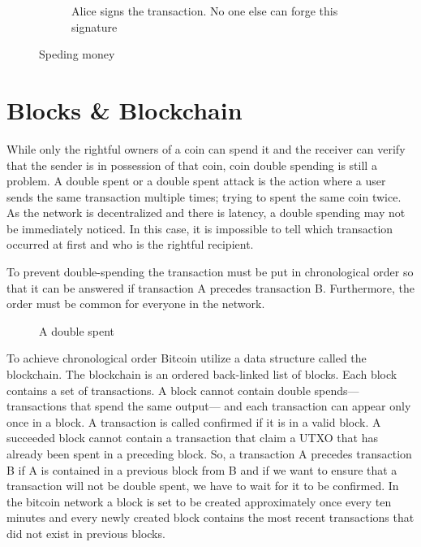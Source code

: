 \begin{figure}[ht!]
\begin{subfigure}[t]{0.50\textwidth}
    \caption{Alice signs the transaction. No one else can forge this signature}
    \label{fig:bl_spent:d}
  \end{subfigure}
  \caption{Speding money}
  \label{fig:bl_spent}
\end{figure}

\section{Blocks \& Blockchain}\label{blockchain:structure:blockchain}

While only the rightful owners of a coin can spend it and the receiver can verify that the sender is in possession of that coin, coin double spending is still a problem. A double spent or a double spent attack is the action where a user sends the same transaction multiple times; trying to spent the same coin twice. As the network is decentralized and there is latency, a double spending may not be immediately noticed. In this case, it is impossible to tell which transaction occurred at first and who is the rightful recipient.

To prevent double-spending the transaction must be put in chronological order so that it can be answered
if transaction A precedes transaction B. Furthermore, the order must be common for everyone in the network.

\begin{figure}[!ht]
  \centering
  \caption{A double spent}
  \label{fig:bl_tx:change}
\end{figure}

To achieve chronological order Bitcoin utilize a data structure called the blockchain. The blockchain is an ordered back-linked list of blocks. Each block contains a set of transactions. A block cannot contain double spends---transactions that spend the same output--- and each transaction can appear only once in a block. A transaction is called confirmed if it is in a valid block. A succeeded block cannot contain a transaction that claim a UTXO that has already been spent in a preceding block. So, a transaction A precedes transaction B if A is contained in a previous block from B and if we want to ensure that a transaction will not be double spent, we have to wait for it to be confirmed. In the bitcoin network a block is set to be created approximately once every ten minutes and every newly created block contains the most recent transactions that did not exist in previous blocks.

